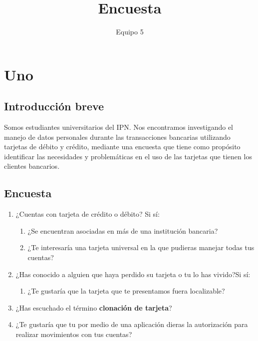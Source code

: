 \documentclass[11pt]{report}
\title{Encuesta}
\author{Equipo 5}
\date{}
\begin{document}
	\maketitle
	\makeProjectCharter
	\tableofcontents

\chapter{Uno}
\section{Introducción breve}

Somos estudiantes universitarios del IPN. Nos encontramos investigando el manejo de datos personales durante las transacciones bancarias utilizando tarjetas de débito y crédito, mediante una encuesta que tiene como propósito identificar las necesidades y problemáticas en el uso de las tarjetas que tienen los clientes bancarios.

\section{Encuesta}
\begin{enumerate}
	\item ¿Cuentas con tarjeta de crédito o débito? Si sí:
		\begin{enumerate}
			\item ¿Se encuentran asociadas en más de una institución bancaria?
			\item ¿Te interesaría una tarjeta universal en la que pudieras manejar todas
			tus cuentas?
		\end{enumerate}
	\item ¿Has conocido a alguien que haya perdido su tarjeta o tu lo has vivido?Si sí:
		\begin{enumerate}
			\item ¿Te gustaría que la tarjeta que te presentamos fuera localizable?
		\end{enumerate}
	\item ¿Has escuchado el término \textbf{clonación de tarjeta}?
		
	\item ¿Te gustaría que tu por medio de una aplicación dieras la autorización para realizar movimientos con tus cuentas?
\end{enumerate}
\end{document}

